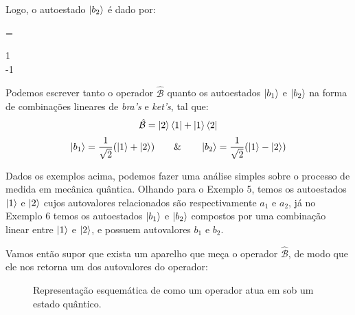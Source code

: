 \begin{example}
        Logo, o autoestado $\ket{b_{2}}$ é dado por:
            \begin{answer*}
                 = 
                \begin{bmatrix*}[r]
                    1 \\ -1
                \end{bmatrix*}
            \end{answer*}
        
        \begin{note}{}
            Podemos escrever tanto o operador $\hat{\mathcal{B}}$ quanto os autoestados $\ket{b_{1}}$ e $\ket{b_{2}}$ na forma de combinações lineares de \textit{bra's} e \textit{ket's}, tal que:
                \begin{equation*}
                    \hat{\mathcal{B}} = \ket{2}\bra{1} + \ket{1}\bra{2}
                \end{equation*}
                \begin{equation*}
                    \ket{b_{1}} = \dfrac{1}{\sqrt{2}}(\ket{1} + \ket{2}) \qquad \& \qquad
                    \ket{b_{2}} = \dfrac{1}{\sqrt{2}}(\ket{1} - \ket{2})
                \end{equation*}
        \end{note}
        
    \end{example}
    
    Dados os exemplos acima, podemos fazer uma análise simples sobre o processo de medida em mecânica quântica. Olhando para o Exemplo 5, temos os autoestados $\ket{1}$ e $\ket{2}$ cujos autovalores relacionados são respectivamente $a_{1}$ e $a_{2}$, já no Exemplo 6 temos os autoestados $\ket{b_{1}}$ e $\ket{b_{2}}$ compostos por uma combinação linear entre $\ket{1}$ e $\ket{2}$, e possuem autovalores $b_{1}$ e $b_{2}$.
    
    Vamos então supor que exista um aparelho que meça o operador $\hat{\mathcal{B}}$, de modo que ele nos retorna um dos autovalores do operador:
        \begin{figure}[H]
            \centering
            \caption{Representação esquemática de como um operador atua em sob um estado quântico.}
            \label{Operators measurement}
        \end{figure}
    
